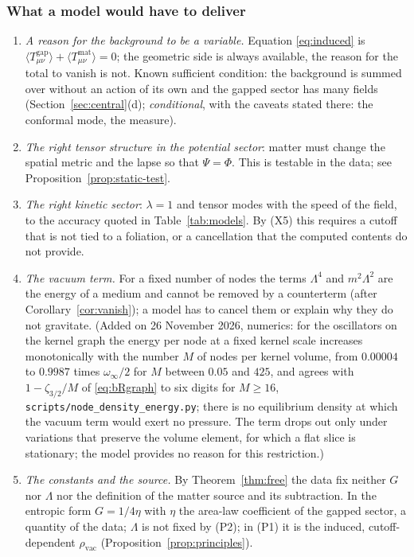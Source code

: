 \documentclass[11pt,a4paper]{article}
\theoremstyle{stmt}
\theoremstyle{defn}
\theoremstyle{rmk}
\numberwithin{equation}{section}
\begin{document}
{\subsubsection{What a model would have to deliver}

\begin{enumerate}
\item[(R1)] \emph{A reason for the background to be a variable.} Equation \eqref{eq:induced} is $\langle T^{\mathrm{gap}}_{\mu\nu}\rangle+\langle T^{\mathrm{mat}}_{\mu\nu}\rangle=0$; the geometric side is always available, the reason for the total to vanish is not. Known sufficient condition: the background is summed over without an action of its own and the gapped sector has many fields (Section~\ref{sec:central}(d); \emph{conditional}, with the caveats stated there: the conformal mode, the measure).
\item[(R2)] \emph{The right tensor structure in the potential sector}: matter must change the spatial metric and the lapse so that $\Psi=\Phi$. This is testable in the data; see Proposition~\ref{prop:static-test}.
\item[(R3)] \emph{The right kinetic sector}: $\lambda=1$ and tensor modes with the speed of the field, to the accuracy quoted in Table~\ref{tab:models}. By (X5) this requires a cutoff that is not tied to a foliation, or a cancellation that the computed contents do not provide.
\item[(R4)] \emph{The vacuum term.} For a fixed number of nodes the terms $\Lambda^4$ and $m^2\Lambda^2$ are the energy of a medium and cannot be removed by a counterterm (after Corollary~\ref{cor:vanish}); a model has to cancel them or explain why they do not gravitate. (Added on 26 November 2026, numerics: for the oscillators on the kernel graph the energy per node at a fixed kernel scale increases monotonically with the number $M$ of nodes per kernel volume, from $0.00004$ to $0.9987$ times $\omega_\infty/2$ for $M$ between $0.05$ and $425$, and agrees with $1-\zeta_{3/2}/M$ of \eqref{eq:bRgraph} to six digits for $M\ge16$, \texttt{scripts/node\_density\_energy.py}; there is no equilibrium density at which the vacuum term would exert no pressure. The term drops out only under variations that preserve the volume element, for which a flat slice is stationary; the model provides no reason for this restriction.)
\item[(R5)] \emph{The constants and the source.} By Theorem~\ref{thm:free} the data fix neither $G$ nor $\Lambda$ nor the definition of the matter source and its subtraction. In the entropic form $G=1/4\eta$ with $\eta$ the area-law coefficient of the gapped sector, a quantity of the data; $\Lambda$ is not fixed by (P2); in (P1) it is the induced, cutoff-dependent $\rho_{\mathrm{vac}}$ (Proposition~\ref{prop:principles}).
\end{enumerate}

}
\end{document}
